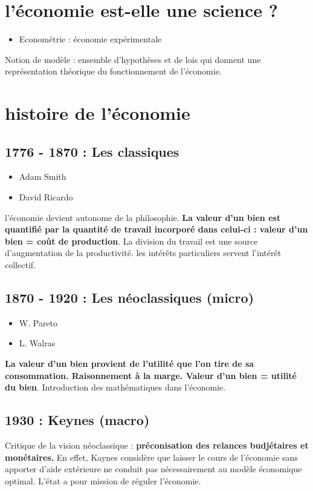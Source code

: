 \section{l'économie est-elle une science ?}
\begin{itemize}
    \item Econométrie : économie expérimentale
\end{itemize}
Notion de modèle : ensemble d'hypothèses et de lois qui donnent une représentation théorique du fonctionnement de l'économie. \newpage
\section{histoire de l'économie}
\subsection{1776 - 1870 : \textcolor{BrickRed}{Les classiques}}
\begin{itemize}
    \item Adam Smith
    \item David Ricardo
\end{itemize}
l'économie devient autonome de la philosophie. \textbf{La valeur d'un bien est quantifié par la quantité de travail incorporé dans celui-ci : \newline valeur d'un bien = coût de production}. La division du travail est une source d'augmentation de la productivité. les intérêts particuliers servent l'intérêt collectif.
\subsection{1870 - 1920 : \textcolor{BrickRed}{Les néoclassiques (micro)}}
\begin{itemize}
    \item W. Pareto
    \item L. Walras
\end{itemize}
\textbf{La valeur d'un bien provient de l'utilité que l'on tire de sa consommation. Raisonnement à la marge. Valeur d'un bien = utilité du bien}. Introduction des mathématiques dans l'économie.
\subsection{1930 : \textcolor{BrickRed}{Keynes (macro)}}
Critique de la vision néoclassique : \textbf{préconisation des relances budjétaires et monétaires.} En effet, Kaynes considère que laisser le cours de l'économie sans apporter d'aide extérieure ne conduit pas nécessairement au modèle économique optimal. L'état a pour mission de réguler l'économie. \newpage
